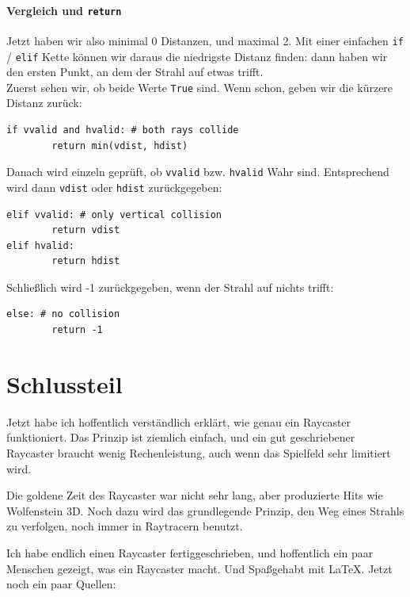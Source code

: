 \documentclass[a4paper,12pt]{report}
\newcommand{\mychapter}[2]{
    \setcounter{chapter}{#1}
    \setcounter{section}{0}
    \chapter*{#2}
    \addcontentsline{toc}{chapter}{#2}
}
\begin{document}
\subsubsection{Vergleich und \texttt{return}}
Jetzt haben wir also minimal 0 Distanzen, und maximal 2. Mit einer einfachen \texttt{if} / \texttt{elif} Kette k\"onnen wir daraus die niedrigste Distanz finden: dann haben wir den ersten Punkt, an dem der Strahl auf etwas trifft. \\
Zuerst sehen wir, ob beide Werte \texttt{True} sind. Wenn schon, geben wir die k\"urzere Distanz zur\"uck:
\begin{Verbatim}[baselinestretch=1.0, xleftmargin=1cm]
if vvalid and hvalid: # both rays collide
        return min(vdist, hdist)
\end{Verbatim}
Danach wird einzeln gepr\"uft, ob \texttt{vvalid} bzw. \texttt{hvalid} Wahr sind. Entsprechend wird dann \texttt{vdist} oder \texttt{hdist} zur\"uckgegeben:
\begin{Verbatim}[baselinestretch=1.0, xleftmargin=1cm]
elif vvalid: # only vertical collision
        return vdist
elif hvalid:
        return hdist
\end{Verbatim}
Schlie\ss lich wird -1 zur\"uckgegeben, wenn der Strahl auf nichts trifft:
\begin{Verbatim}[baselinestretch=1.0, xleftmargin=1cm]
else: # no collision
        return -1
\end{Verbatim}

\begingroup
\renewcommand{\cleardoublepage}{}
\renewcommand{\clearpage}{}

\mychapter{3}{Schlussteil}
Jetzt habe ich hoffentlich verst\"andlich erkl\"art, wie genau ein Raycaster funktioniert. Das Prinzip ist ziemlich einfach, und ein gut geschriebener Raycaster braucht wenig Rechenleistung, auch wenn das Spielfeld sehr limitiert wird.

Die goldene Zeit des Raycaster war nicht sehr lang, aber produzierte Hits wie Wolfenstein 3D. Noch dazu wird das grundlegende Prinzip, den Weg eines Strahls zu verfolgen, noch immer in Raytracern benutzt.

Ich habe endlich einen Raycaster fertiggeschrieben, und hoffentlich ein paar Menschen gezeigt, was ein Raycaster macht. Und Spa\ss  gehabt mit \LaTeX. Jetzt noch ein paar Quellen:
\endgroup
\end{document}
